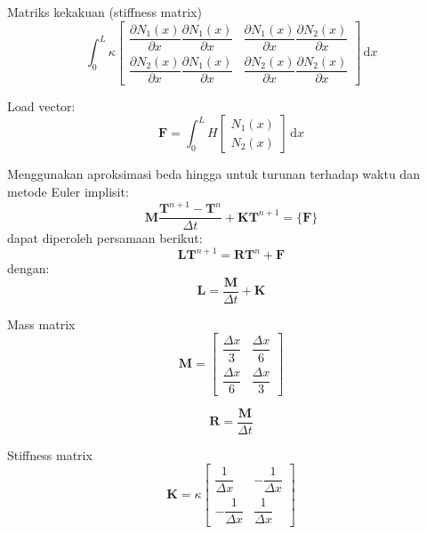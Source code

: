Matriks kekakuan (stiffness matrix)
\begin{equation*}
\int_{0}^{L} \kappa
\begin{bmatrix}
\dfrac{\partial N_{1}(x)}{\partial x} \dfrac{\partial N_{1}(x)}{\partial x} &
\dfrac{\partial N_{1}(x)}{\partial x} \dfrac{\partial N_{2}(x)}{\partial x} \\[0.25cm]
\dfrac{\partial N_{2}(x)}{\partial x} \dfrac{\partial N_{1}(x)}{\partial x} &
\dfrac{\partial N_{2}(x)}{\partial x} \dfrac{\partial N_{2}(x)}{\partial x}
\end{bmatrix} \, \mathrm{d}x
\end{equation*}

Load vector:
\begin{equation*}
\mathbf{F} = \int_{0}^{L} H \begin{bmatrix} N_{1}(x) \\ N_{2}(x) \end{bmatrix}\, \mathrm{d}x
\end{equation*}

Menggunakan aproksimasi beda hingga untuk turunan terhadap waktu dan metode
Euler implisit:
\begin{equation}
\mathbf{M} \frac{ \mathbf{T}^{n+1} - \mathbf{T}^{n}}{\Delta t} +
\mathbf{K} \mathbf{T}^{n+1} = \{ \mathbf{F} \}
\end{equation}
dapat diperoleh persamaan berikut:
\begin{equation*}
\mathbf{L} \mathbf{T}^{n+1} = \mathbf{R} \mathbf{T}^{n} + \mathbf{F}
\end{equation*}
dengan:
\begin{equation*}
\mathbf{L} = \frac{\mathbf{M}}{\Delta t} + \mathbf{K}
\end{equation*}

Mass matrix
\begin{equation*}
\mathbf{M} = \begin{bmatrix}
\dfrac{\Delta x}{3} & \dfrac{\Delta x}{6} \\
\dfrac{\Delta x}{6} & \dfrac{\Delta x}{3}
\end{bmatrix}
\end{equation*}

\begin{equation*}
\mathbf{R} = \frac{\mathbf{M}}{\Delta t}
\end{equation*}


Stiffness matrix
\begin{equation*}
\mathbf{K} = \kappa\begin{bmatrix}
\dfrac{1}{\Delta x} & -\dfrac{1}{\Delta x} \\[0.4cm]
-\dfrac{1}{\Delta x} & \dfrac{1}{\Delta x}
\end{bmatrix}
\end{equation*}



